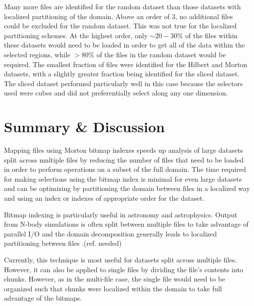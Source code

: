 \documentclass[apjl]{emulateapj}
\newcommand{\todo}[1]{{\color{red}{#1}}}
\newcommand{\addref}{{\color{red}(ref. needed)}}
\begin{document}
Many more files are identified for the random dataset than those datasets with localized partitioning of the domain. Above an order of 3, no additional files could be excluded for the random dataset. This was not true for the localized partitioning schemes. At the highest order, only $\sim20-30$\% of the files within these datasets would need to be loaded in order to get all of the data within the selected regions, while $>80$\% of the files in the random dataset would be required. The smallest fraction of files were identified for the Hilbert and Morton datasets, with a slightly greater fraction being identified for the sliced dataset. The sliced dataset performed particularly well in this case because the selectors used were cubes and did not preferentially select along any one dimension.

\section{Summary \& Discussion}\label{S:discuss}
Mapping files using Morton bitmap indexes speeds up analysis of large datasets split across multiple files by reducing the number of files that need to be loaded in order to perform operations on a subset of the full domain. The time required for making selections using the bitmap index is minimal for even large datasets and can be optimizing by partitioning the domain between files in a localized way and using an index or indexes of appropriate order for the dataset. 

Bitmap indexing is particularly useful in astronomy and astrophysics. Output from N-body simulations is often split between multiple files to take advantage of parallel I/O and the domain decomposition generally leads to localized partitioning between files \citep{Springel2001,Springel2005b,Hopkins2015}.\addref \todo{more}

\todo{applications outside astronomy}

Currently, this technique is most useful for datasets split across multiple files. However, it can also be applied to single files by dividing the file's contents into chunks. However, as in the multi-file case, the single file would need to be organized such that chunks were localized within the domain to take full advantage of the bitmaps.

\acknowledgments
\todo{write something}
\end{document}
